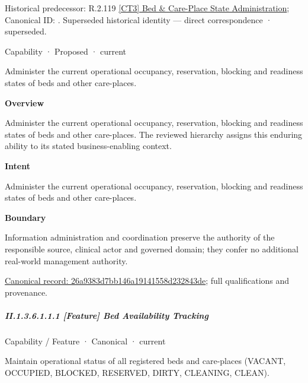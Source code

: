 {\small Historical predecessor: R.2.119 \hyperref[element:dd2e2ee1a68845c087ba93610752181b]{[CT3] Bed \& Care-Place State Administration}; Canonical ID: \texttt{}. Superseded historical identity — direct correspondence · superseded.}\par
\label{element:26a9383d7bb146a19141558d232843de}
{\small Capability · Proposed · current}\par

Administer the current operational occupancy, reservation, blocking and readiness states of beds and other care-places.



\textbf{Overview}



Administer the current operational occupancy, reservation, blocking and readiness states of beds and other care-places. The reviewed hierarchy assigns this enduring ability to its stated business-enabling context.



\textbf{Intent}



Administer the current operational occupancy, reservation, blocking and readiness states of beds and other care-places.



\textbf{Boundary}



Information administration and coordination preserve the authority of the responsible source, clinical actor and governed domain; they confer no additional real-world management authority.


{\footnotesize \href{../../../../../../../continuum/strategy/capability/26a9383d7bb146a19141558d232843de.md}{Canonical record: 26a9383d7bb146a19141558d232843de}; full qualifications and provenance.}\par
\subparagraph*{II.1.3.6.1.1.1 [Feature] Bed Availability Tracking}
\label{navigation:II.1.3.6.1.1.1}

\label{element:7c61f21e558c44ab92c267a781116d1d}
{\small Capability / Feature · Canonical · current}\par

Maintain operational status of all registered beds and care-places (VACANT, OCCUPIED, BLOCKED, RESERVED, DIRTY, CLEANING, CLEAN).




